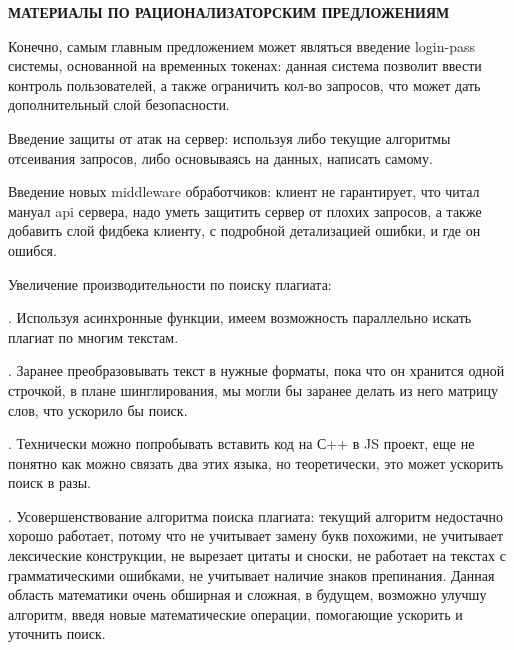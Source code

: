 \begin{center}
\bfseries{\large МАТЕРИАЛЫ ПО РАЦИОНАЛИЗАТОРСКИМ ПРЕДЛОЖЕНИЯМ}
\end{center}

Конечно, самым главным предложением может являться введение login-pass системы, основанной на временных токенах: данная система позволит ввести контроль пользователей, а также ограничить кол-во запросов, что может дать дополнительный слой безопасности.

Введение защиты от атак на сервер: используя либо текущие алгоритмы отсеивания запросов, либо основываясь на данных, написать самому.

Введение новых middleware обработчиков: клиент не гарантирует, что читал мануал api сервера, надо уметь защитить сервер от плохих запросов, а также добавить слой фидбека клиенту, с подробной детализацией ошибки, и где он ошибся.

Увеличение производительности по поиску плагиата:

. Используя асинхронные функции, имеем возможность параллельно искать плагиат по многим текстам.

. Заранее преобразовывать текст в нужные форматы, пока что он хранится одной строчкой, в плане шинглирования, мы могли бы заранее делать из него матрицу слов, что ускорило бы поиск.

. Технически можно попробывать вставить код на С++ в JS проект, еще не понятно как можно связать два этих языка, но теоретически, это может ускорить поиск в разы.

. Усовершенствование алгоритма поиска плагиата: текущий алгоритм недостачно хорошо работает, потому что не учитывает замену букв похожими, не учитывает лексические конструкции, не вырезает цитаты и сноски, не работает на текстах с грамматическими ошибками, не учитывает наличие знаков препинания. Данная область математики очень обширная и сложная, в будущем, возможно улучшу алгоритм, введя новые математические операции, помогающие ускорить и уточнить поиск.

\pagebreak
